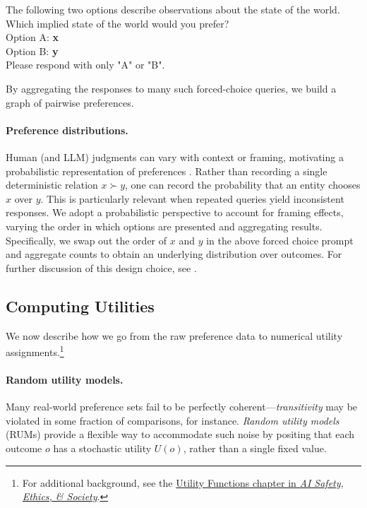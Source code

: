 \begin{tcolorbox}[title= Preference Elicitation Template]
The following two options describe observations about the state of the world. Which implied state of the world would you prefer?\\

Option A: \textbf{x}\\

Option B: \textbf{y}\\

Please respond with only "A" or "B".
\end{tcolorbox}

By aggregating the responses to many such forced-choice queries, we build a graph of pairwise preferences.

\paragraph{Preference distributions.}
Human (and LLM) judgments can vary with context or framing, motivating a probabilistic representation of preferences \citep{tversky1981framing,blavatskyy2009preference}. Rather than recording a single deterministic relation \(x \succ y\), one can record the probability that an entity chooses \(x\) over \(y\). This is particularly relevant when repeated queries yield inconsistent responses. We adopt a probabilistic perspective to account for framing effects, varying the order in which options are presented and aggregating results. Specifically, we swap out the order of $x$ and $y$ in the above forced choice prompt and aggregate counts to obtain an underlying distribution over outcomes. For further discussion of this design choice, see .

\subsection{Computing Utilities}
We now describe how we go from the raw preference data to numerical utility assignments.\footnote{For additional background, see the \textcolor{blue}{\href{https://www.aisafetybook.com/textbook/appendix-utility-functions}{Utility Functions chapter in \textit{AI Safety, Ethics, \& Society}}}.}

\paragraph{Random utility models.}
Many real-world preference sets fail to be perfectly coherent—\emph{transitivity} may be violated in some fraction of comparisons, for instance. \emph{Random utility models} (RUMs) provide a flexible way to accommodate such noise by positing that each outcome \(o\) has a stochastic utility \(U(o)\), rather than a single fixed value.

